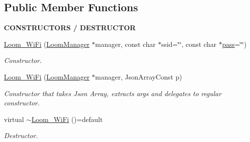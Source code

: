 \subsection*{Public Member Functions}
\begin{Indent}{\bf C\+O\+N\+S\+T\+R\+U\+C\+T\+O\+RS / D\+E\+S\+T\+R\+U\+C\+T\+OR}\par
\begin{DoxyCompactItemize}
\item 
\hyperlink{class_loom___wi_fi_aea47b7d7cb8edb95c40be6a66afd8e7b}{Loom\+\_\+\+Wi\+Fi} (\hyperlink{class_loom_manager}{Loom\+Manager} $\ast$manager, const char $\ast$ssid=\char`\"{}\char`\"{}, const char $\ast$\hyperlink{class_loom___wi_fi_a36402713f3a011add130d1b0b8182822}{pass}=\char`\"{}\char`\"{})
\begin{DoxyCompactList}\small\item\em Constructor. \end{DoxyCompactList}\item 
\hyperlink{class_loom___wi_fi_ac8db313f659033fac297dd3fbc780d8e}{Loom\+\_\+\+Wi\+Fi} (\hyperlink{class_loom_manager}{Loom\+Manager} $\ast$manager, Json\+Array\+Const p)
\begin{DoxyCompactList}\small\item\em Constructor that takes Json Array, extracts args and delegates to regular constructor. \end{DoxyCompactList}\item 
virtual \hyperlink{class_loom___wi_fi_a354101fb513f6e8f2d51cfc411b790ef}{$\sim$\+Loom\+\_\+\+Wi\+Fi} ()=default
\begin{DoxyCompactList}\small\item\em Destructor. \end{DoxyCompactList}\end{DoxyCompactItemize}
\end{Indent}
